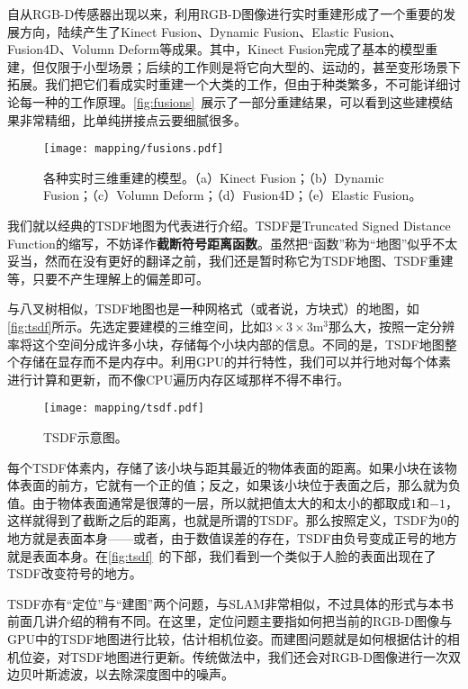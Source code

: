 自从RGB-D传感器出现以来，利用RGB-D图像进行实时重建形成了一个重要的发展方向，陆续产生了Kinect Fusion\textsuperscript{\cite{Newcombe2011}}、Dynamic Fusion\textsuperscript{\cite{Newcombe2015}}、Elastic Fusion\textsuperscript{\cite{Whelan2015}}、Fusion4D\textsuperscript{\cite{Dou2016}}、Volumn Deform\textsuperscript{\cite{Innmann2016}}等成果。其中，Kinect Fusion完成了基本的模型重建，但仅限于小型场景；后续的工作则是将它向大型的、运动的，甚至变形场景下拓展。我们把它们看成实时重建一个大类的工作，但由于种类繁多，不可能详细讨论每一种的工作原理。\autoref{fig:fusions}~展示了一部分重建结果，可以看到这些建模结果非常精细，比单纯拼接点云要细腻很多。

\begin{figure}[!htp]
	\centering
	\texttt{[image: mapping/fusions.pdf]}
	\caption{各种实时三维重建的模型。（a）Kinect Fusion；（b）Dynamic Fusion；（c）Volumn Deform；（d）Fusion4D；（e）Elastic Fusion。}
	\label{fig:fusions}
\end{figure}

我们就以经典的TSDF地图为代表进行介绍。TSDF是Truncated Signed Distance Function的缩写，不妨译作\textbf{截断符号距离函数}。虽然把“函数”称为“地图”似乎不太妥当，然而在没有更好的翻译之前，我们还是暂时称它为TSDF地图、TSDF重建等，只要不产生理解上的偏差即可。

与八叉树相似，TSDF地图也是一种网格式（或者说，方块式）的地图，如\autoref{fig:tsdf}所示。先选定要建模的三维空间，比如$3\times3\times3 \text{m}^3$那么大，按照一定分辨率将这个空间分成许多小块，存储每个小块内部的信息。不同的是，TSDF地图整个存储在显存而不是内存中。利用GPU的并行特性，我们可以并行地对每个体素进行计算和更新，而不像CPU遍历内存区域那样不得不串行。

\begin{figure}[!t]
	\centering
	\texttt{[image: mapping/tsdf.pdf]}
	\caption{TSDF示意图。}
	\label{fig:tsdf}
\end{figure}

每个TSDF体素内，存储了该小块与距其最近的物体表面的距离。如果小块在该物体表面的前方，它就有一个正的值；反之，如果该小块位于表面之后，那么就为负值。由于物体表面通常是很薄的一层，所以就把值太大的和太小的都取成$1$和$-1$，这样就得到了截断之后的距离，也就是所谓的TSDF。那么按照定义，TSDF为0的地方就是表面本身——或者，由于数值误差的存在，TSDF由负号变成正号的地方就是表面本身。在\autoref{fig:tsdf}~的下部，我们看到一个类似于人脸的表面出现在了TSDF改变符号的地方。

\newpage
\enlargethispage{4pt}
TSDF亦有“定位”与“建图”两个问题，与SLAM非常相似，不过具体的形式与本书前面几讲介绍的稍有不同。在这里，定位问题主要指如何把当前的RGB-D图像与GPU中的TSDF地图进行比较，估计相机位姿。而建图问题就是如何根据估计的相机位姿，对TSDF地图进行更新。传统做法中，我们还会对RGB-D图像进行一次双边贝叶斯滤波，以去除深度图中的噪声。

